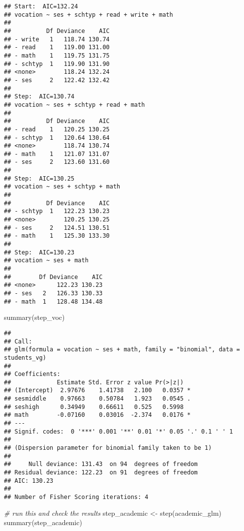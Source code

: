 \documentclass[
  oneside]{book}
\newenvironment{Shaded}{\begin{snugshade}}{\end{snugshade}}
\newcommand{\CommentTok}[1]{\textcolor[rgb]{0.56,0.35,0.01}{\textit{#1}}}
\newcommand{\FunctionTok}[1]{\textcolor[rgb]{0.00,0.00,0.00}{#1}}
\newcommand{\NormalTok}[1]{#1}
\newcommand{\OtherTok}[1]{\textcolor[rgb]{0.56,0.35,0.01}{#1}}
\begin{document}
\begin{verbatim}
## Start:  AIC=132.24
## vocation ~ ses + schtyp + read + write + math
## 
##          Df Deviance    AIC
## - write   1   118.74 130.74
## - read    1   119.00 131.00
## - math    1   119.75 131.75
## - schtyp  1   119.90 131.90
## <none>        118.24 132.24
## - ses     2   122.42 132.42
## 
## Step:  AIC=130.74
## vocation ~ ses + schtyp + read + math
## 
##          Df Deviance    AIC
## - read    1   120.25 130.25
## - schtyp  1   120.64 130.64
## <none>        118.74 130.74
## - math    1   121.07 131.07
## - ses     2   123.60 131.60
## 
## Step:  AIC=130.25
## vocation ~ ses + schtyp + math
## 
##          Df Deviance    AIC
## - schtyp  1   122.23 130.23
## <none>        120.25 130.25
## - ses     2   124.51 130.51
## - math    1   125.30 133.30
## 
## Step:  AIC=130.23
## vocation ~ ses + math
## 
##        Df Deviance    AIC
## <none>      122.23 130.23
## - ses   2   126.33 130.33
## - math  1   128.48 134.48
\end{verbatim}

\begin{Shaded}
\begin{Highlighting}[]
\FunctionTok{summary}\NormalTok{(step\_voc)}
\end{Highlighting}
\end{Shaded}

\begin{verbatim}
## 
## Call:
## glm(formula = vocation ~ ses + math, family = "binomial", data = students_vg)
## 
## Coefficients:
##             Estimate Std. Error z value Pr(>|z|)  
## (Intercept)  2.97676    1.41738   2.100   0.0357 *
## sesmiddle    0.97663    0.50784   1.923   0.0545 .
## seshigh      0.34949    0.66611   0.525   0.5998  
## math        -0.07160    0.03016  -2.374   0.0176 *
## ---
## Signif. codes:  0 '***' 0.001 '**' 0.01 '*' 0.05 '.' 0.1 ' ' 1
## 
## (Dispersion parameter for binomial family taken to be 1)
## 
##     Null deviance: 131.43  on 94  degrees of freedom
## Residual deviance: 122.23  on 91  degrees of freedom
## AIC: 130.23
## 
## Number of Fisher Scoring iterations: 4
\end{verbatim}

\begin{Shaded}
\begin{Highlighting}[]
\CommentTok{\# run this and check the results}
\NormalTok{step\_academic }\OtherTok{\textless{}{-}} \FunctionTok{step}\NormalTok{(academic\_glm)}
\FunctionTok{summary}\NormalTok{(step\_academic)}
\end{Highlighting}
\end{Shaded}
\end{document}
